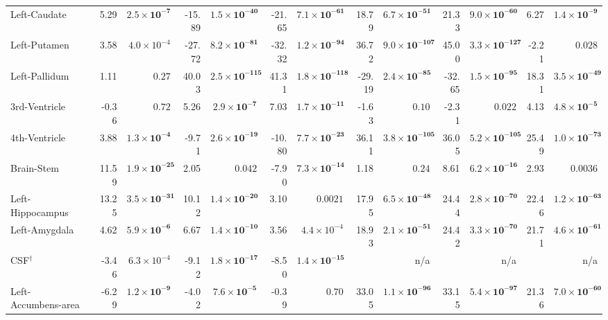 {\begin{longtable}{llrrrrrrrrrrrr}
Left-Caudate &  & 5.29 & $\mathbf{2.5{\times}10^{-7}}$ & -15.89 & $\mathbf{1.5{\times}10^{-40}}$ & -21.65 & $\mathbf{7.1{\times}10^{-61}}$ & 18.79 & $\mathbf{6.7{\times}10^{-51}}$ & 21.33 & $\mathbf{9.0{\times}10^{-60}}$ & 6.27 & $\mathbf{1.4{\times}10^{-9}}$ \\
Left-Putamen &  & 3.58 & $4.0{\times}10^{-4}$ & -27.72 & $\mathbf{8.2{\times}10^{-81}}$ & -32.32 & $\mathbf{1.2{\times}10^{-94}}$ & 36.72 & $\mathbf{9.0{\times}10^{-107}}$ & 45.00 & $\mathbf{3.3{\times}10^{-127}}$ & -2.21 & $0.028$ \\
Left-Pallidum &  & 1.11 & $0.27$ & 40.03 & $\mathbf{2.5{\times}10^{-115}}$ & 41.31 & $\mathbf{1.8{\times}10^{-118}}$ & -29.19 & $\mathbf{2.4{\times}10^{-85}}$ & -32.65 & $\mathbf{1.5{\times}10^{-95}}$ & 18.31 & $\mathbf{3.5{\times}10^{-49}}$ \\
3rd-Ventricle &  & -0.36 & $0.72$ & 5.26 & $\mathbf{2.9{\times}10^{-7}}$ & 7.03 & $\mathbf{1.7{\times}10^{-11}}$ & -1.63 & $0.10$ & -2.31 & $0.022$ & 4.13 & $\mathbf{4.8{\times}10^{-5}}$ \\
4th-Ventricle &  & 3.88 & $\mathbf{1.3{\times}10^{-4}}$ & -9.71 & $\mathbf{2.6{\times}10^{-19}}$ & -10.80 & $\mathbf{7.7{\times}10^{-23}}$ & 36.11 & $\mathbf{3.8{\times}10^{-105}}$ & 36.05 & $\mathbf{5.2{\times}10^{-105}}$ & 25.49 & $\mathbf{1.0{\times}10^{-73}}$ \\
Brain-Stem &  & 11.59 & $\mathbf{1.9{\times}10^{-25}}$ & 2.05 & $0.042$ & -7.90 & $\mathbf{7.3{\times}10^{-14}}$ & 1.18 & $0.24$ & 8.61 & $\mathbf{6.2{\times}10^{-16}}$ & 2.93 & $0.0036$ \\
Left-Hippocampus &  & 13.25 & $\mathbf{3.5{\times}10^{-31}}$ & 10.12 & $\mathbf{1.4{\times}10^{-20}}$ & 3.10 & $0.0021$ & 17.95 & $\mathbf{6.5{\times}10^{-48}}$ & 24.44 & $\mathbf{2.8{\times}10^{-70}}$ & 22.46 & $\mathbf{1.2{\times}10^{-63}}$ \\
Left-Amygdala &  & 4.62 & $\mathbf{5.9{\times}10^{-6}}$ & 6.67 & $\mathbf{1.4{\times}10^{-10}}$ & 3.56 & $4.4{\times}10^{-4}$ & 18.93 & $\mathbf{2.1{\times}10^{-51}}$ & 24.42 & $\mathbf{3.3{\times}10^{-70}}$ & 21.71 & $\mathbf{4.6{\times}10^{-61}}$ \\
CSF$^{\dagger}$ &  & -3.46 & $6.3{\times}10^{-4}$ & -9.12 & $\mathbf{1.8{\times}10^{-17}}$ & -8.50 & $\mathbf{1.4{\times}10^{-15}}$ &  & n/a &  & n/a &  & n/a \\
Left-Accumbens-area &  & -6.29 & $\mathbf{1.2{\times}10^{-9}}$ & -4.02 & $\mathbf{7.6{\times}10^{-5}}$ & -0.39 & $0.70$ & 33.05 & $\mathbf{1.1{\times}10^{-96}}$ & 33.15 & $\mathbf{5.4{\times}10^{-97}}$ & 21.36 & $\mathbf{7.0{\times}10^{-60}}$ \\

\end{longtable}}
